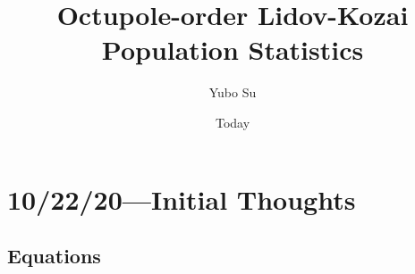 \documentclass[10pt,
        twocolumn,
        fleqn,
    ]{revtex4-2}%
\begin{document}
\linespread{1.15}
\setlength{\mathindent}{0pt}

\title{Octupole-order Lidov-Kozai Population Statistics}
\author{Yubo Su}
\date{Today}

\maketitle

\section{10/22/20---Initial Thoughts}

\subsection{Equations}
\end{document}
